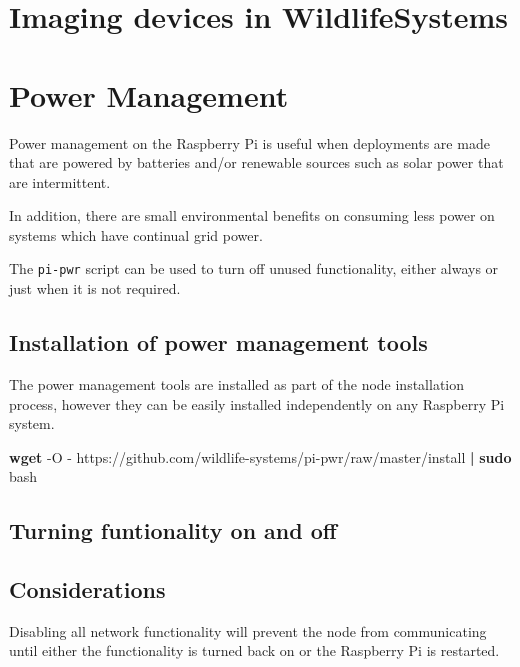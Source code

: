 \documentclass[
]{book}
\newenvironment{Shaded}{\begin{snugshade}}{\end{snugshade}}
\newcommand{\AttributeTok}[1]{\textcolor[rgb]{0.13,0.29,0.53}{#1}}
\newcommand{\FunctionTok}[1]{\textcolor[rgb]{0.13,0.29,0.53}{\textbf{#1}}}
\newcommand{\KeywordTok}[1]{\textcolor[rgb]{0.13,0.29,0.53}{\textbf{#1}}}
\newcommand{\NormalTok}[1]{#1}
\begin{document}
\chapter{Imaging devices in WildlifeSystems}\label{imaging-devices-in-wildlifesystems}

\chapter{Power Management}\label{power-management}

Power management on the Raspberry Pi is useful when deployments are made that are powered by batteries and/or renewable sources such as solar power that are intermittent.

In addition, there are small environmental benefits on consuming less power on systems which have continual grid power.

The \texttt{pi-pwr} script can be used to turn off unused functionality, either always or just when it is not required.

\section{Installation of power management tools}\label{installation-of-power-management-tools}

The power management tools are installed as part of the node installation process, however they can be easily installed independently on any Raspberry Pi system.

\begin{Shaded}
\begin{Highlighting}[]
\FunctionTok{wget} \AttributeTok{{-}O} \AttributeTok{{-}}\NormalTok{ https://github.com/wildlife{-}systems/pi{-}pwr/raw/master/install }\KeywordTok{|} \FunctionTok{sudo}\NormalTok{ bash}
\end{Highlighting}
\end{Shaded}

\section{Turning funtionality on and off}\label{turning-funtionality-on-and-off}

\section{Considerations}\label{considerations}

Disabling all network functionality will prevent the node from communicating until either the functionality is turned back on or the Raspberry Pi is restarted.
\end{document}
